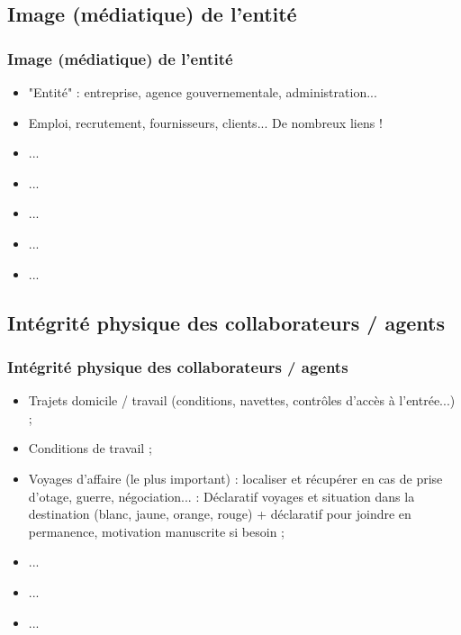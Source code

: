 \documentclass[slidetop,11pt]{beamer}
\begin{document}
\subsection{Image (m{\'e}diatique) de l'entit{\'e}}
\begin{frame}
	\frametitle{Image (m{\'e}diatique) de l'entit{\'e}}
	\begin{itemize}
		\item "Entit{\'e}" : entreprise, agence gouvernementale, administration...
		\item Emploi, recrutement, fournisseurs, clients... De nombreux liens !
		\item ...
		\item ...
		\item ...
		\item ...
		\item ...
	\end{itemize}
\end{frame}

\subsection{Int{\'e}grit{\'e} physique des collaborateurs / agents}
\begin{frame}
	\frametitle{Int{\'e}grit{\'e} physique des collaborateurs / agents}
	\begin{itemize}
		\item Trajets domicile / travail (conditions, navettes, contr{\^o}les d'acc{\`e}s {\`a} l'entr{\'e}e...) ; 
		\item Conditions de travail ; 
		\item Voyages d'affaire (le plus important) : localiser et r{\'e}cup{\'e}rer en cas de prise d'otage, guerre, n{\'e}gociation... : D{\'e}claratif voyages et situation dans la destination (blanc, jaune, orange, rouge) + d{\'e}claratif pour joindre en permanence, motivation manuscrite si besoin ;
		\item ...
		\item ...
		\item ...
	\end{itemize}
\end{frame}
\end{document}
